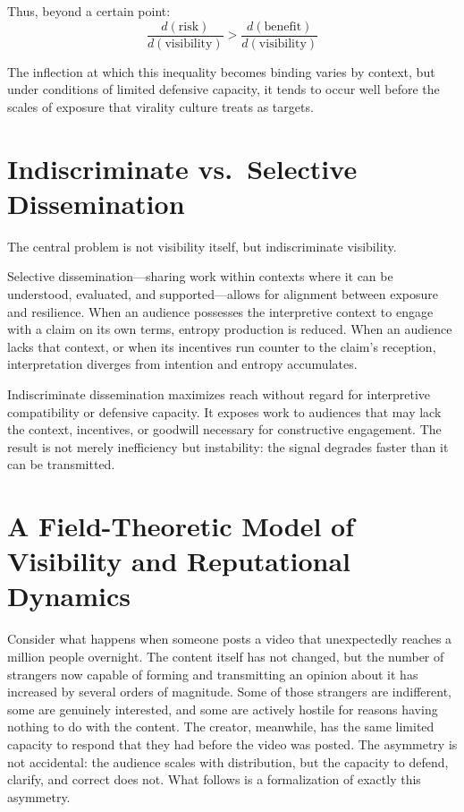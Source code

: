 \documentclass[12pt,a4paper]{article}
\begin{document}
Thus, beyond a certain point:
\[
\frac{d(\text{risk})}{d(\text{visibility})} > \frac{d(\text{benefit})}{d(\text{visibility})}
\]

The inflection at which this inequality becomes binding varies by context, but under conditions of limited defensive capacity, it tends to occur well before the scales of exposure that virality culture treats as targets.


\section{Indiscriminate vs.\ Selective Dissemination}

The central problem is not visibility itself, but indiscriminate visibility.

Selective dissemination---sharing work within contexts where it can be understood, evaluated, and supported---allows for alignment between exposure and resilience. When an audience possesses the interpretive context to engage with a claim on its own terms, entropy production is reduced. When an audience lacks that context, or when its incentives run counter to the claim's reception, interpretation diverges from intention and entropy accumulates.

Indiscriminate dissemination maximizes reach without regard for interpretive compatibility or defensive capacity. It exposes work to audiences that may lack the context, incentives, or goodwill necessary for constructive engagement. The result is not merely inefficiency but instability: the signal degrades faster than it can be transmitted.

\section{A Field-Theoretic Model of Visibility and Reputational Dynamics}

Consider what happens when someone posts a video that unexpectedly reaches a million people overnight. The content itself has not changed, but the number of strangers now capable of forming and transmitting an opinion about it has increased by several orders of magnitude. Some of those strangers are indifferent, some are genuinely interested, and some are actively hostile for reasons having nothing to do with the content. The creator, meanwhile, has the same limited capacity to respond that they had before the video was posted. The asymmetry is not accidental: the audience scales with distribution, but the capacity to defend, clarify, and correct does not. What follows is a formalization of exactly this asymmetry.
\end{document}
